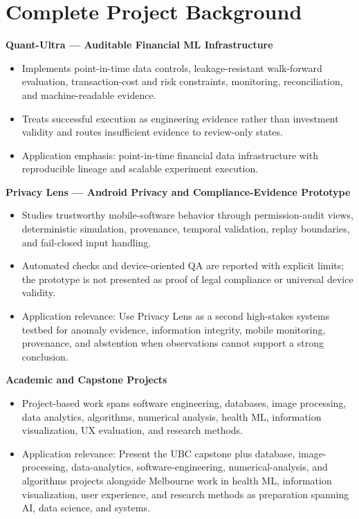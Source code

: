\documentclass[11pt]{article}
\begin{document}
\section*{Complete Project Background}
\textbf{Quant-Ultra --- Auditable Financial ML Infrastructure}
\begin{itemize}
\item Implements point-in-time data controls, leakage-resistant walk-forward evaluation, transaction-cost and risk constraints, monitoring, reconciliation, and machine-readable evidence.
\item Treats successful execution as engineering evidence rather than investment validity and routes insufficient evidence to review-only states.
\item Application emphasis: point-in-time financial data infrastructure with reproducible lineage and scalable experiment execution.
\end{itemize}

\textbf{Privacy Lens --- Android Privacy and Compliance-Evidence Prototype}
\begin{itemize}
\item Studies trustworthy mobile-software behavior through permission-audit views, deterministic simulation, provenance, temporal validation, replay boundaries, and fail-closed input handling.
\item Automated checks and device-oriented QA are reported with explicit limits; the prototype is not presented as proof of legal compliance or universal device validity.
\item Application relevance: Use Privacy Lens as a second high-stakes systems testbed for anomaly evidence, information integrity, mobile monitoring, provenance, and abstention when observations cannot support a strong conclusion.
\end{itemize}

\textbf{Academic and Capstone Projects}
\begin{itemize}
\item Project-based work spans software engineering, databases, image processing, data analytics, algorithms, numerical analysis, health ML, information visualization, UX evaluation, and research methods.
\item Application relevance: Present the UBC capstone plus database, image-processing, data-analytics, software-engineering, numerical-analysis, and algorithms projects alongside Melbourne work in health ML, information visualization, user experience, and research methods as preparation spanning AI, data science, and systems.
\end{itemize}
\end{document}
